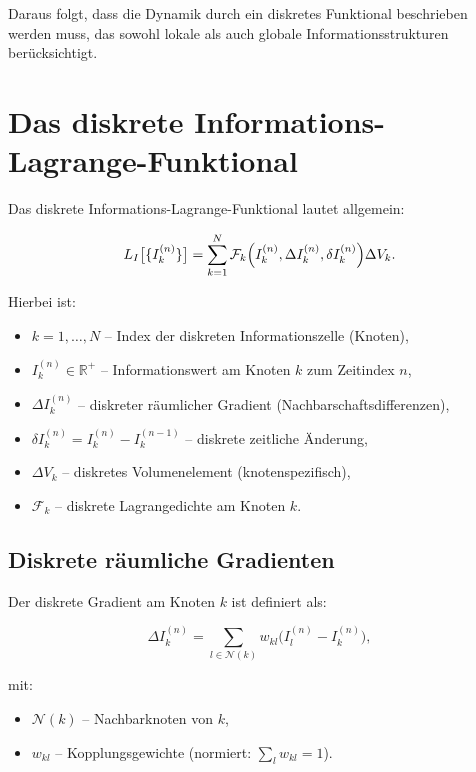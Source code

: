 Daraus folgt, dass die Dynamik durch ein diskretes Funktional beschrieben werden muss, das sowohl lokale als auch globale Informationsstrukturen berücksichtigt.

\section{Das diskrete Informations-Lagrange-Funktional}
\label{sec:lagrange_funktional_def}

Das diskrete Informations-Lagrange-Funktional lautet allgemein:

\[
L_I \bigl[\{I_k^{(n)}\}\bigr] = \sum_{k=1}^{N} \mathcal{F}_k \Bigl( I_k^{(n)}, \Delta I_k^{(n)}, \delta I_k^{(n)} \Bigr) \Delta V_k.
\]

Hierbei ist:

\begin{itemize}
    \item \( k = 1, \dots, N \) – Index der diskreten Informationszelle (Knoten),
    \item \( I_k^{(n)} \in \mathbb{R}^+ \) – Informationswert am Knoten \( k \) zum Zeitindex \( n \),
    \item \( \Delta I_k^{(n)} \) – diskreter räumlicher Gradient (Nachbarschaftsdifferenzen),
    \item \( \delta I_k^{(n)} = I_k^{(n)} - I_k^{(n-1)} \) – diskrete zeitliche Änderung,
    \item \( \Delta V_k \) – diskretes Volumenelement (knotenspezifisch),
    \item \( \mathcal{F}_k \) – diskrete Lagrangedichte am Knoten \( k \).
\end{itemize}

\subsection{Diskrete räumliche Gradienten}
\label{sub:diskrete_gradienten}

Der diskrete Gradient am Knoten \( k \) ist definiert als:

\[
\Delta I_k^{(n)} = \sum_{l \in \mathcal{N}(k)} w_{kl} \bigl( I_l^{(n)} - I_k^{(n)} \bigr),
\]

mit:

\begin{itemize}
    \item \( \mathcal{N}(k) \) – Nachbarknoten von \( k \),
    \item \( w_{kl} \) – Kopplungsgewichte (normiert: \( \sum_l w_{kl} = 1 \)).
\end{itemize}

